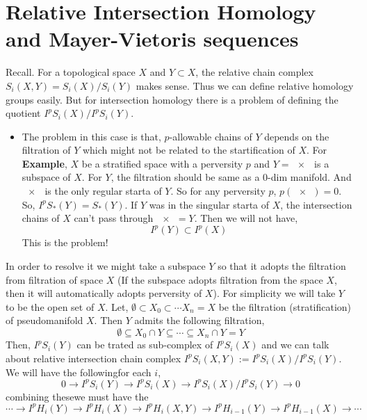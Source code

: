 \documentclass[11pt]{article}
\begin{document}
  \section{Relative Intersection Homology and Mayer-Vietoris sequences}

  Recall. For a topological space $X$ and $Y \subset X$, the relative chain complex $S_i(X,Y) = S_i(X)/S_i(Y)$ makes sense. Thus we can define relative homology groups easily. But for intersection homology there is a problem of defining the quotient $I^pS_i(X)/I^pS_i(Y)$. 
  \begin{itemize}
    \item[] The problem in this case is that, $p$-allowable chains of $Y$ depends on the filtration of $Y$ which might not be related to the startification of $X$. For \textbf{Example}, $X$ be a stratified space with a perversity $p$ and $Y =\qty{x}$ is a subspace of $X$. For $Y$, the filtration should be same as a $0$-dim manifold. And $\qty{x}$ is the only regular starta of $Y$. So for any perversity $p$, $p(\qty{x})=0$. So, $I^pS_{\ast}(Y) = S_{\ast}(Y)$. If $Y$ was in the singular starta of $X$, the intersection chains of $X$ can't pass through $\qty{x}=Y$. Then we will not have, \[I^p(Y)\subset I^p(X)\]
    This is the problem!
  \end{itemize}
In order to resolve it we might take a subspace $Y$ so that it adopts the filtration from filtration of space $X$ (If the subspace adopts filtration from the space $X$, then it will automatically adopts perversity of $X$). For simplicity we will take $Y$ to be the open set of $X$. Let, $\emptyset \subset X_0 \subset \cdots X_n=X$ be the filtration (stratification) of pseudomanifold $X$. Then $Y$ admits the following filtration, \[\emptyset \subseteq X_0\cap Y \subseteq \cdots \subseteq X_n\cap Y=Y\]
Then, $I^pS_i(Y)$ can be trated as sub-complex of $I^pS_i(X)$ and we can talk about relative intersection chain complex $I^pS_i(X,Y) := I^pS_i(X)/I^pS_i(Y)$. We will have the following\ess for each $i$, \[0 \to I^pS_i(Y) \to I^pS_i(X) \to I^pS_i(X)/I^pS_i(Y)\to 0\] \cite{GM_1990} combining these\ess we must have the\les   \[\cdots \to I^pH_i(Y) \to I^pH_i(X) \to I^pH_i(X,Y) \to I^pH_{i-1}(Y)\to I^pH_{i-1}(X)\to \cdots\]


  \pagebreak

  \printbibliography[ 
        heading=bibintoc,
        title={Bibliography}
    ]
\end{document}
